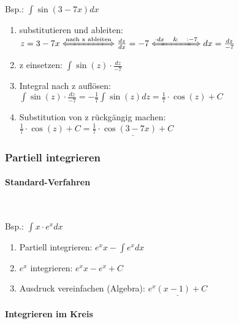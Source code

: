 				\begin{minipage}[c]{.2\textwidth}
					Bsp.: $ \int \sin (3-7 x) d x $
				\end{minipage}
				\begin{minipage}{.8\textwidth}
					\begin{enumerate}
						\item substitutieren und ableiten:\quad $z=3-7 x \xLongleftrightarrow{\text{nach x ableiten}} \frac{d z}{d x}=-7 \xLongleftrightarrow{\cdot dx \quad \& \quad :-7} d x=\frac{d z}{-7}$
						\item z einsetzen: \quad$\int \sin (z) \cdot \frac{d z}{-7}$
						\item Integral nach z auflösen:\quad $\int \sin (z) \cdot \frac{d z}{-7}=-\frac{1}{7} \int \sin (z) d z =\frac{1}{7} \cdot \cos (z)+C$
						\item Substitution von z rückgängig machen:\quad $\frac{1}{7} \cdot \cos (z)+C= \underline{\frac{1}{7} \cdot \cos (3-7 x)+C}$
					\end{enumerate}				
				\end{minipage}
		
		\subsubsection{Partiell integrieren}
			\paragraph{Standard-Verfahren}\
			
				\begin{minipage}[c]{.2\textwidth}
					Bsp.: $ \int x \cdot e^x dx $
				\end{minipage}
				\begin{minipage}{.8\textwidth}
					\begin{enumerate}
						\item Partiell integrieren: \quad $e^{x} x-\int e^{x} d x$
						\item $e^x$ integrieren: \quad $e^{x} x-e^{x}+C$
						\item Ausdruck vereinfachen (Algebra): \quad $\underline{e^{x}(x-1)+C}$
					\end{enumerate}				
				\end{minipage}
			
			\paragraph{Integrieren im Kreis}\
			
